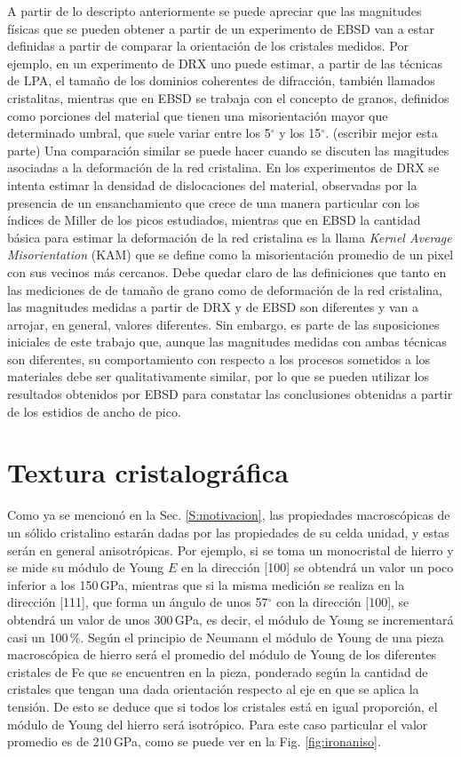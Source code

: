 A partir de lo descripto anteriormente se puede apreciar que las magnitudes físicas que se pueden obtener a partir de un experimento de EBSD van a estar definidas a partir de comparar la orientación de los cristales medidos.
Por ejemplo, en un experimento de DRX uno puede estimar, a partir de las técnicas de LPA, el tamaño de los dominios coherentes de difracción, también llamados cristalitas, mientras que en EBSD se trabaja con el concepto de granos, definidos como porciones del material que tienen una misorientación mayor que determinado umbral, que suele variar entre los 5$^{\circ}$ y los 15$^{\circ}$. (escribir mejor esta parte)
Una comparación similar se puede hacer cuando se discuten las magitudes asociadas a la deformación de la red cristalina. En los experimentos de DRX se intenta estimar la densidad de dislocaciones del material, observadas por la presencia de un ensanchamiento que crece de una manera particular con los índices  de Miller de los picos estudiados, mientras que en EBSD la cantidad básica para estimar la deformación de la red cristalina es la llama \textit{Kernel Average Misorientation} (KAM) que se define como la misorientación promedio de un pixel con sus vecinos más cercanos.
Debe quedar claro de las definiciones que tanto en las mediciones de de tamaño de grano como de deformación de la red cristalina, las magnitudes medidas a partir de DRX y de EBSD son diferentes y van a arrojar, en general, valores diferentes.
Sin embargo, es parte de las suposiciones iniciales de este trabajo que, aunque las magnitudes medidas con ambas técnicas son diferentes, su comportamiento con respecto a los procesos sometidos a los materiales debe ser qualitativamente similar, por lo que se pueden utilizar los resultados obtenidos por EBSD para constatar las conclusiones obtenidas a partir de los estidios de ancho de pico.

\section{Textura cristalográfica}\label{S:Text}
Como ya se mencionó en la Sec. \ref{S:motivacion}, las propiedades macroscópicas de un sólido cristalino estarán dadas por las propiedades de su celda unidad, y estas serán en general anisotrópicas.
Por ejemplo, si se toma un monocristal de hierro y se mide su módulo de Young $E$ en la dirección [100] se obtendrá un valor un poco inferior a los 150\,GPa, mientras que si la misma medición se realiza en la dirección [111], que forma un ángulo de unos 57$^{\circ}$ con la dirección [100], se obtendrá un valor de unos 300\,GPa, es decir, el módulo de Young se incrementará casi un 100\,\%.
Según el principio de Neumann\cite{nye1985physical} el módulo de Young de una pieza macroscópica de hierro será el promedio del módulo de Young de los diferentes cristales de Fe que se encuentren en la pieza, ponderado según la cantidad de cristales que tengan una dada orientación respecto al eje en que se aplica la tensión.
De esto se deduce que si todos los cristales está en igual proporción, el módulo de Young del hierro será isotrópico.
Para este caso particular el valor promedio es de 210\,GPa, como se puede ver en la Fig. \ref{fig:ironaniso}.

